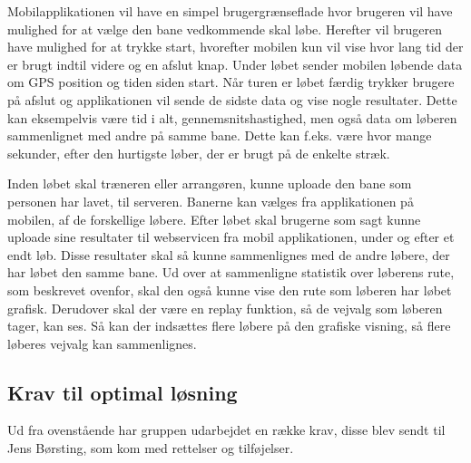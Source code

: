 Mobilapplikationen vil have en simpel brugergrænseflade hvor brugeren vil have mulighed for at vælge den bane vedkommende skal løbe. Herefter vil brugeren have mulighed for at trykke start, hvorefter mobilen kun vil vise hvor lang tid der er brugt indtil videre og en afslut knap. Under løbet sender mobilen løbende data om GPS position og tiden siden start. Når turen er løbet færdig trykker brugere på afslut og applikationen vil sende de sidste data og vise nogle resultater. Dette kan eksempelvis være tid i alt, gennemsnitshastighed, men også data om løberen sammenlignet med andre på samme bane. Dette kan f.eks. være hvor mange sekunder, efter den hurtigste løber, der er brugt på de enkelte stræk.

Inden løbet skal træneren eller arrangøren, kunne uploade den bane som personen har lavet, til serveren. Banerne kan vælges fra applikationen på mobilen, af de forskellige løbere. Efter løbet skal brugerne som sagt kunne uploade sine resultater til webservicen fra mobil applikationen, under og efter et endt løb. Disse resultater skal så kunne sammenlignes med de andre løbere, der har løbet den samme bane. Ud over at sammenligne statistik over løberens rute, som beskrevet ovenfor, skal den også kunne vise den rute som løberen har løbet grafisk. Derudover skal der være en replay funktion, så de vejvalg som løberen tager, kan ses. Så kan der indsættes flere løbere på den grafiske visning, så flere løberes vejvalg kan sammenlignes.

\subsection{Krav til optimal løsning}
Ud fra ovenstående har gruppen udarbejdet en række krav, disse blev sendt til Jens Børsting, som kom med rettelser og tilføjelser.

